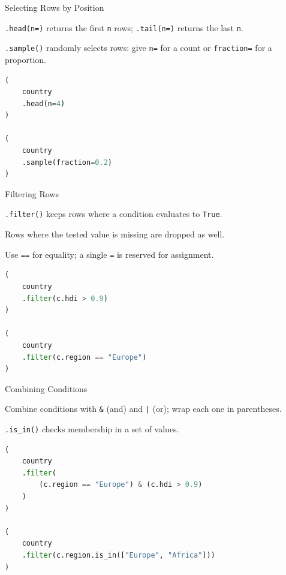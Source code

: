 \documentclass[8pt,aspectratio=169]{beamer}
\begin{document}
\begin{frame}[fragile]{Selecting Rows by Position}
\begin{splitcode}{%

\texttt{.head(n=)} returns the first \texttt{n} rows; \texttt{.tail(n=)} returns the last \texttt{n}.

\texttt{.sample()} randomly selects rows: give \texttt{n=} for a count or \texttt{fraction=} for a proportion.

}
\begin{lstlisting}[language=Python]
(
    country
    .head(n=4)
)

(
    country
    .sample(fraction=0.2)
)
\end{lstlisting}
\end{splitcode}
\end{frame}

\begin{frame}[fragile]{Filtering Rows}
\begin{splitcode}{%

\texttt{.filter()} keeps rows where a condition evaluates to \texttt{True}.

Rows where the tested value is missing are dropped as well.

Use \texttt{==} for equality; a single \texttt{=} is reserved for assignment.

}
\begin{lstlisting}[language=Python]
(
    country
    .filter(c.hdi > 0.9)
)

(
    country
    .filter(c.region == "Europe")
)
\end{lstlisting}
\end{splitcode}
\end{frame}

\begin{frame}[fragile]{Combining Conditions}
\begin{splitcode}{%

Combine conditions with \texttt{\&} (and) and \texttt{|} (or); wrap each one in parentheses.

\texttt{.is\_in()} checks membership in a set of values.

}
\begin{lstlisting}[language=Python]
(
    country
    .filter(
        (c.region == "Europe") & (c.hdi > 0.9)
    )
)

(
    country
    .filter(c.region.is_in(["Europe", "Africa"]))
)
\end{lstlisting}
\end{splitcode}
\end{frame}
\end{document}
